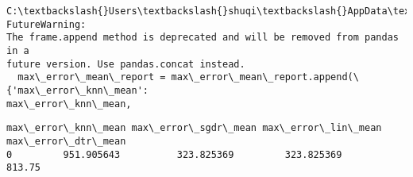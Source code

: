 \documentclass[11pt]{article}
\makeatletter
\newcommand{\boxspacing}{\kern\kvtcb@left@rule\kern\kvtcb@boxsep}
\newcommand{\prompt}[4]{
        {\ttfamily\llap{{\color{#2}[#3]:\hspace{3pt}#4}}\vspace{-\baselineskip}}
    }
\makeatother
\begin{document}
    \begin{Verbatim}[commandchars=\\\{\}]
C:\textbackslash{}Users\textbackslash{}shuqi\textbackslash{}AppData\textbackslash{}Local\textbackslash{}Temp\textbackslash{}ipykernel\_10424\textbackslash{}532847308.py:9: FutureWarning:
The frame.append method is deprecated and will be removed from pandas in a
future version. Use pandas.concat instead.
  max\_error\_mean\_report = max\_error\_mean\_report.append(\{'max\_error\_knn\_mean':
max\_error\_knn\_mean,
    \end{Verbatim}

            \begin{tcolorbox}[breakable, size=fbox, boxrule=.5pt, pad at break*=1mm, opacityfill=0]
\prompt{Out}{outcolor}{116}{\boxspacing}
\begin{Verbatim}[commandchars=\\\{\}]
  max\_error\_knn\_mean max\_error\_sgdr\_mean max\_error\_lin\_mean max\_error\_dtr\_mean
0         951.905643          323.825369         323.825369             813.75
\end{Verbatim}
\end{tcolorbox}
        
\end{document}
